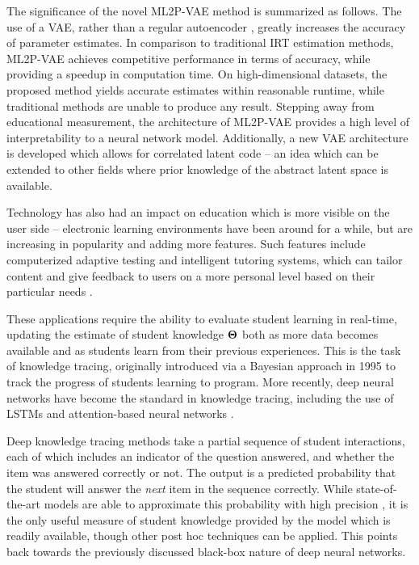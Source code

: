 The significance of the novel ML2P-VAE method is summarized as follows. The use of a VAE, rather than a regular autoencoder \cite{guo2017}, greatly increases the accuracy of parameter estimates. In comparison to traditional IRT estimation methods, ML2P-VAE achieves competitive performance in terms of accuracy, while providing a speedup in computation time. On high-dimensional datasets, the proposed method yields accurate estimates within reasonable runtime, while traditional methods are unable to produce any result. Stepping away from educational measurement, the architecture of ML2P-VAE provides a high level of interpretability to a neural network model. Additionally, a new VAE architecture is developed which allows for correlated latent code -- an idea which can be extended to other fields where prior knowledge of the abstract latent space is available.

Technology has also had an impact on education which is more visible on the user side -- electronic learning environments have been around for a while, but are increasing in popularity and adding more features. Such features include computerized adaptive testing and intelligent tutoring systems, which can tailor content and give feedback to users on a more personal level based on their particular needs \cite{meijer1999, ong2003}.

These applications require the ability to evaluate student learning in real-time, updating the estimate of student knowledge $\boldsymbol{\Theta}$ both as more data becomes available and as students learn from their previous experiences. This is the task of knowledge tracing, originally introduced via a Bayesian approach in 1995 \cite{corbett1995} to track the progress of students learning to program. More recently, deep neural networks have become the standard in knowledge tracing, including the use of LSTMs \cite{piech2015} and attention-based neural networks \cite{pandey2019}.

Deep knowledge tracing methods take a partial sequence of student interactions, each of which includes an indicator of the question answered, and whether the item was answered correctly or not. The output is a predicted probability that the student will answer the \textit{next} item in the sequence correctly. While state-of-the-art models are able to approximate this probability with high precision \cite{zhang2017}, it is the only useful measure of student knowledge provided by the model which is readily available, though other post hoc techniques can be applied. This points back towards the previously discussed black-box nature of deep neural networks.

